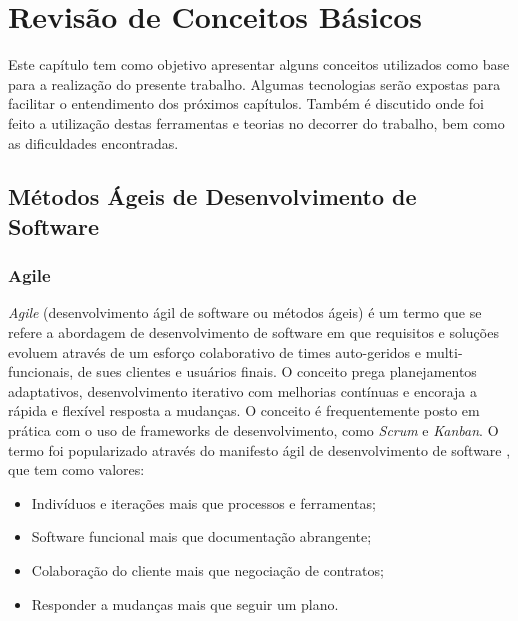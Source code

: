 \chapter{Revisão de Conceitos Básicos} \label{cap:concepts}
Este capítulo tem como objetivo apresentar alguns conceitos utilizados como base para a realização do presente trabalho. Algumas tecnologias serão expostas para facilitar o entendimento dos próximos capítulos. Também é discutido onde foi feito a utilização destas ferramentas e teorias no decorrer do trabalho, bem como as dificuldades encontradas.
\section{Métodos Ágeis de Desenvolvimento de Software}

\subsection{Agile}
\textit{Agile} (desenvolvimento ágil de software ou métodos ágeis) é um termo que se refere a abordagem de desenvolvimento de software em que requisitos e soluções evoluem através de um esforço colaborativo de times auto-geridos e multi-funcionais, de sues clientes e usuários finais. O conceito prega planejamentos adaptativos, desenvolvimento iterativo com melhorias contínuas e encoraja a rápida e flexível resposta a mudanças. O conceito é frequentemente posto em prática com o uso de frameworks de desenvolvimento, como \textit{Scrum} e \textit{Kanban}. O termo foi popularizado através do manifesto ágil de desenvolvimento de software \cite{agile-manifet}, que tem como valores:

\begin{itemize}
    \item Indivíduos e iterações mais que processos e ferramentas;
    \item Software funcional mais que documentação abrangente;
    \item Colaboração do cliente mais que negociação de contratos;
    \item Responder a mudanças mais que seguir um plano.
\end{itemize}

